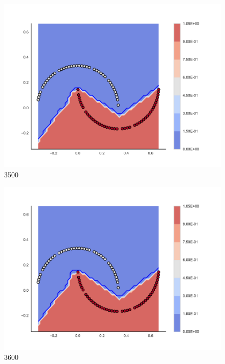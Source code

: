 \begin{subfigure}[b]{0.09\textwidth}
    \includegraphics[clip, trim=2.35cm 1.75cm 4.5cm 0cm,width=\textwidth]{img/convergence/3500.pdf}
    \caption{3500}
    \label{fig:convergence_3500}
\end{subfigure}
%
\begin{subfigure}[b]{0.09\textwidth}
    \includegraphics[clip, trim=2.35cm 1.75cm 4.5cm 0cm,width=\textwidth]{img/convergence/3600.pdf}
    \caption{3600}
    \label{fig:convergence_3600}
\end{subfigure}
%
